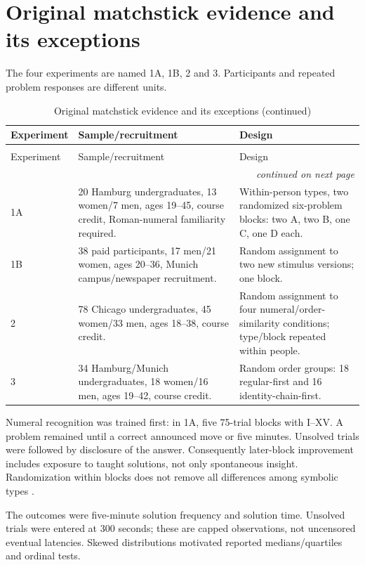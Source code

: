 \section{Original matchstick evidence and its exceptions}
\label{sec:p19-insight-matchstick-evidence}

The four experiments are named 1A, 1B, 2 and 3.
Participants and repeated problem responses are different units.

\begin{longtable}{@{}lp{}p{}@{}}
\caption{Original matchstick evidence and its exceptions}\\
\toprule Experiment & Sample/recruitment & Design\\ \midrule
\endfirsthead
\caption[]{Original matchstick evidence and its exceptions (continued)}\\
\toprule Experiment & Sample/recruitment & Design\\ \midrule
\endhead
\midrule\multicolumn{3}{r}{\emph{continued on next page}}\\
\endfoot
\endlastfoot
1A &20 Hamburg undergraduates, 13 women/7 men, ages 19--45,
course credit, Roman-numeral familiarity required.&
Within-person types, two randomized six-problem blocks:
two A, two B, one C, one D each.\\
1B &38 paid participants, 17 men/21 women, ages 20--36,
Munich campus/newspaper recruitment.&
Random assignment to two new stimulus versions; one block.\\
2 &78 Chicago undergraduates, 45 women/33 men, ages 18--38, course credit.&
Random assignment to four numeral/order-similarity conditions;
type/block repeated within people.\\
3 &34 Hamburg/Munich undergraduates, 18 women/16 men, ages 19--42,
course credit.&
Random order groups: 18 regular-first and 16 identity-chain-first.\\
\bottomrule
\end{longtable}

Numeral recognition was trained first: in 1A, five 75-trial blocks with I--XV.
A problem remained until a correct announced move or five minutes.
Unsolved trials were followed by disclosure of the answer.
Consequently later-block improvement includes exposure to taught solutions,
not only spontaneous insight. Randomization within blocks does not remove
all differences among symbolic types
\parencite[pp.~1539,1541,1544,1548]{KnoblichEtAl1999ConstraintsChunks}.

The outcomes were five-minute solution frequency and solution time.
Unsolved trials were entered at 300 seconds; these are capped observations,
not uncensored eventual latencies. Skewed distributions motivated reported
medians/quartiles and ordinal tests.

